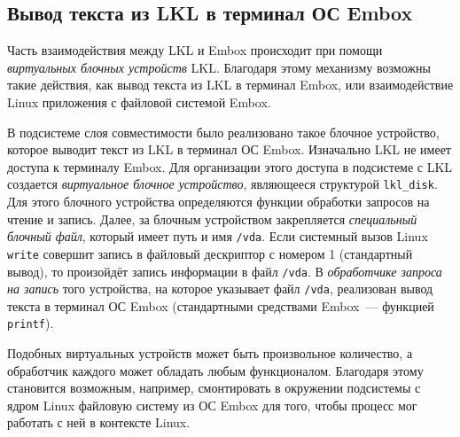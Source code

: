 
\subsection{Вывод текста из LKL в терминал ОС Embox}

Часть взаимодействия между LKL и Embox происходит при помощи \textit{виртуальных блочных устройств} LKL. Благодаря этому механизму возможны такие действия, как вывод текста из LKL в терминал Embox, или взаимодействие Linux приложения с файловой системой Embox.

В подсистеме слоя совместимости было реализовано такое блочное устройство, которое выводит текст из LKL в терминал ОС Embox. Изначально LKL не имеет доступа к терминалу Embox. Для организации этого доступа в подсистеме с LKL создается \textit{виртуальное блочное устройство}, являющееся структурой \texttt{lkl\_disk}. Для этого блочного устройства определяются функции обработки запросов на чтение и запись. Далее, за блочным устройством закрепляется \textit{специальный блочный файл}, который имеет путь и имя \texttt{/vda}. Если системный вызов Linux \texttt{write} совершит запись в файловый дескриптор с номером 1 (стандартный вывод), то произойдёт запись информации в файл \texttt{/vda}. В \textit{обработчике запроса на запись} того устройства, на которое указывает файл \texttt{/vda}, реализован вывод текста в терминал ОС Embox (стандартными средствами Embox~--- функцией \texttt{printf}).

Подобных виртуальных устройств может быть произвольное количество, а обработчик каждого может обладать любым функционалом. Благодаря этому становится возможным, например, смонтировать в окружении подсистемы с ядром Linux файловую систему из ОС Embox для того, чтобы процесс мог работать с ней в контексте Linux.
